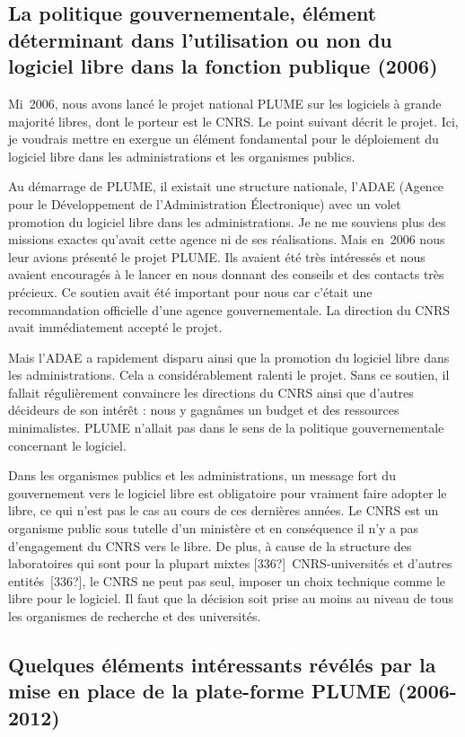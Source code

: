 \documentclass{FramateX}
\begin{document}
\begin{refsection}
\subsection*{La politique gouvernementale, élément déterminant dans l'utilisation ou
non du logiciel libre dans la fonction publique (2006) }

Mi~2006, nous avons lancé le projet national PLUME sur les logiciels à
grande majorité libres, dont le porteur est le CNRS. Le point suivant
décrit le projet. Ici, je voudrais mettre en exergue un élément
fondamental pour le déploiement du logiciel libre dans les
administrations et les organismes publics.

Au démarrage de PLUME, il existait une structure nationale, l'ADAE
(Agence pour le Développement de l'Administration Électronique) avec un
volet promotion du logiciel libre dans les administrations. Je ne me
souviens plus des missions exactes qu'avait cette agence ni de ses
réalisations. Mais en~2006 nous leur avions présenté le projet PLUME.
Ils avaient été très intéressés et nous avaient encouragés à le lancer
en nous donnant des conseils et des contacts très précieux. Ce soutien
avait été important pour nous car c'était une recommandation officielle
d'une agence gouvernementale. La direction du CNRS avait immédiatement
accepté le projet.

Mais l'ADAE a rapidement disparu ainsi que la promotion du logiciel
libre dans les administrations. Cela a considérablement ralenti le
projet. Sans ce soutien, il fallait régulièrement convaincre les
directions du CNRS ainsi que d'autres décideurs de son intérêt : nous y
gagnâmes un budget et des ressources minimalistes. PLUME n'allait pas
dans le sens de la politique gouvernementale concernant le logiciel.

Dans les organismes publics et les administrations, un message fort du
gouvernement vers le logiciel libre est obligatoire pour vraiment faire
adopter le libre, ce qui n'est pas le cas au cours de ces dernières
années. Le CNRS est un organisme public sous tutelle d'un ministère et
en conséquence il n'y a pas d'engagement du CNRS vers le libre. De
plus, à cause de la structure des laboratoires qui sont pour la plupart
mixtes [336?]~CNRS-universités et d'autres entités~[336?], le CNRS ne
peut pas seul, imposer un choix technique comme le libre pour le
logiciel. Il faut que la décision soit prise au moins au niveau de tous
les organismes de recherche et des universités.


\subsection*{Quelques éléments intéressants révélés par la mise en place de la
plate-forme PLUME (2006-2012)}


\end{refsection}
\end{document}
